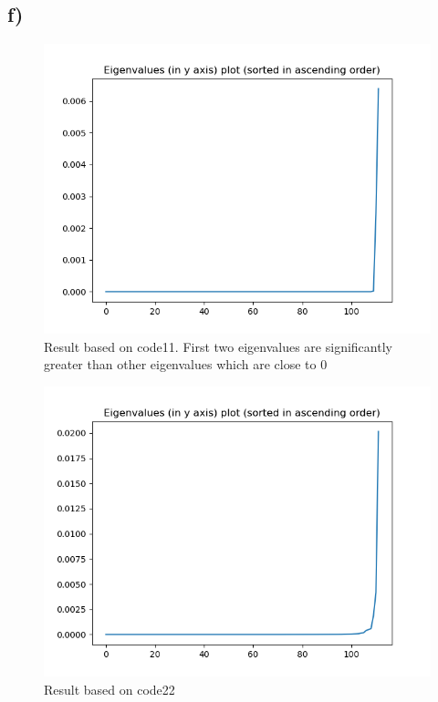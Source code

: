 \documentclass{article}
\begin{document}
\newpage
\thispagestyle{fancy}

\subsection{f)}
\begin{figure}[H]
    \centerline{\includegraphics[scale=0.5]{../results/hand/eigen-values.png}}
    \caption{Result based on code11. First two eigenvalues are significantly greater than other eigenvalues which are close to 0}
\end{figure}

\begin{figure}[H]
    \centerline{\includegraphics[scale=0.5]{../results/hand/eigen-values2.png}}
    \caption{Result based on code22}
\end{figure}
\end{document}
